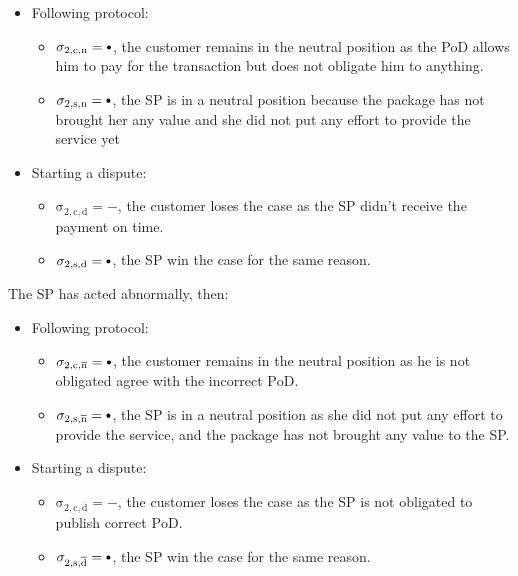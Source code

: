 \documentclass{ieeeaccess}
\newcommand\neutral[1][.75]{\mathbin{\ThisStyle{\vcenter{\hbox{%
  \scalebox{#1}{$\SavedStyle\bullet$}}}}}%
}
\begin{document}
\begin{itemize}
\item
  Following protocol:

  \begin{itemize}
  
  \item
    \(\operatorname{\sigma_{2, c, n} = \neutral}\), the customer remains in the neutral position as the PoD allows him to pay for the transaction but does not obligate him to anything.
  \item
    \(\operatorname{\sigma_{2, s, n} = \neutral}\), the SP is in a neutral position because the package has not brought her any value and she did not put any effort to provide the service yet
  \end{itemize}
\item
  Starting a dispute:

  \begin{itemize}
  
  \item
    \(\operatorname{\sigma_{2, c, d} = -}\), the customer loses the case as the SP didn't receive the payment on time.
  \item
    \(\operatorname{\sigma_{2, s, d} = \neutral}\), the SP win the case for the same reason.
  \end{itemize}
\end{itemize}

The SP has acted abnormally, then:

\begin{itemize}
\item
  Following protocol:

  \begin{itemize}
  
  \item
    \(\operatorname{\sigma_{2, c, \overline{n}} = \neutral}\), the customer remains in the neutral position as he is not obligated agree with the incorrect $\mathrm{PoD}$.
  \item
    \(\operatorname{\sigma_{2, s, \overline{n}} = \neutral}\), the SP is in a neutral position as she did not put any effort to provide the service, and the package has not brought any value to the SP.
  \end{itemize}
\item
  Starting a dispute:

  \begin{itemize}
  
  \item
    \(\operatorname{\sigma_{2, c, \overline{d}} = -}\), the customer loses the case as the SP is not obligated to publish correct $\mathrm{PoD}$.
  \item
    \(\operatorname{\sigma_{2, s, \overline{d}} = \neutral}\), the SP win the case for the same reason.
  \end{itemize}
\end{itemize}
\end{document}
